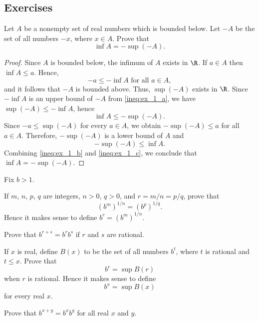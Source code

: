 \subsection{Exercises}
\begin{exercise}
Let $A$ be a nonempty set of real numbers which is bounded below.
Let $-A$ be the set of all numbers $-x$, where $x \in A$.
Prove that \[\inf A = -\sup (-A).\]
\end{exercise}
\begin{proof}
Since $A$ is bounded below, the infimum of $A$ exists in $\R$. 
If $a \in A$ then $\inf A \leq a$. Hence,
\begin{equation}\label{ineq:ex_1_a}
-a \leq -\inf A \text{ for all } a \in A,
\end{equation}
and it follows that $-A$ is bounded above. Thus, $\sup (-A)$ exists in $\R$.
Since $- \inf A$ is an upper bound of $-A$ from \eqref{ineq:ex_1_a}, we have $\sup (-A) \leq -\inf A$, hence 
\begin{equation}\label{ineq:ex_1_b}
\inf A \leq -\sup(-A).
\end{equation}
Since $-a \leq \sup(-A)$ for every $a \in A$, we obtain $-\sup (-A) \leq a$ for all $a \in A$.
Therefore, $-\sup(-A)$ is a lower bound of $A$ and 
\begin{equation}\label{ineq:ex_1_c}
-\sup(-A) \leq  \inf A.
\end{equation}
Combining \eqref{ineq:ex_1_b} and \eqref{ineq:ex_1_c}, we conclude that $\inf A = -\sup (-A)$.
\end{proof}
\begin{exercise}
Fix $b>1$.
\item[(a)] If $m$, $n$, $p$, $q$ are integers, $n>0$, $q>0$, and $r=m/n=p/q$, prove that 
 \[
 (b^m)^{1/n}=(b^p)^{1/q}.
 \]
 Hence it makes sense to define $b^r = (b^m)^{1/n}$.
 \item[(b)] Prove that $b^{r+s} = b^r b^s$ if $r$ and $s$ are rational.
 \item[(c)] If $x$ is real, define $B(x)$ to be the set of all numbers $b^t$, where $t$ is rational and $t \leq x$. 
Prove that \[b^r = \sup B(r)\] when $r$ is rational.
Hence it makes sense to define \[b^x = \sup B(x)\] for every real $x$.
\item[(d)] Prove that $b^{x+y}=b^xb^y$ for all real $x$ and $y$.

\end{exercise}
